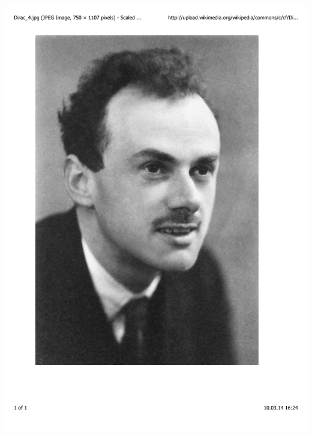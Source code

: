 \documentclass[mathserif,8pt]{beamer}
\begin{document}
\begin{frame}
\begin{columns}
\begin{column}{.30\textwidth}
	\includegraphics[viewport = 50 200 500 800, clip, scale=0.1]{figures/dirac.pdf}
    \end{column}
    \end{columns}
\end{frame}
\end{document}
